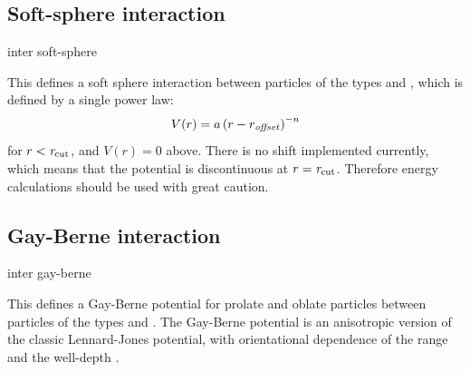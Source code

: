 \subsection{Soft-sphere interaction}

\begin{essyntax}
  inter  
  soft-sphere    
  \begin{features}
  \end{features}
\end{essyntax}
This defines a soft sphere interaction between particles of the types
 and , which is defined by a single power law:
\begin{equation}
  V(r)=a\left(r-r_\mathrm{\mathrm{\mathit{offset}}}\right)^{-n}
\end{equation}
for $r<\mathrm{\mathit{r_\mathrm{cut}}}$, and $V(r)=0$ above. There is no shift
implemented currently, which means that the potential is discontinuous
at $r=\mathrm{\mathit{r_\mathrm{cut}}}$. Therefore energy calculations should be
used with great caution.

\subsection{Gay-Berne interaction}

\begin{essyntax}
  inter   gay-berne
    
    \var{\mu} \var{\nu}
  \begin{features}
  \end{features}
\end{essyntax}
This defines a Gay-Berne potential for prolate and oblate particles
between particles of the types  and . The
Gay-Berne potential is an anisotropic version of the classic
Lennard-Jones potential, with orientational dependence of the range
 and the well-depth .

